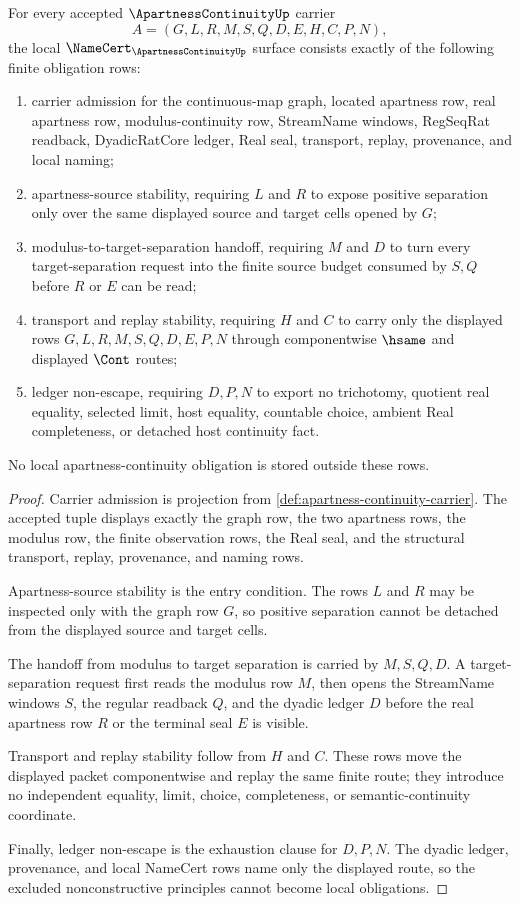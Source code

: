 \begin{theorem}
\label{thm:apartness-continuity-namecert-obligations}
For every accepted $\ApartnessContinuityUp$ carrier
$$
A=(G,L,R,M,S,Q,D,E,H,C,P,N),
$$
the local $\NameCert_{\ApartnessContinuityUp}$ surface consists exactly of the following finite obligation rows:
\begin{enumerate}
\item carrier admission for the continuous-map graph, located apartness row, real apartness row, modulus-continuity row, StreamName windows, RegSeqRat readback, DyadicRatCore ledger, Real seal, transport, replay, provenance, and local naming;
\item apartness-source stability, requiring $L$ and $R$ to expose positive separation only over the same displayed source and target cells opened by $G$;
\item modulus-to-target-separation handoff, requiring $M$ and $D$ to turn every target-separation request into the finite source budget consumed by $S,Q$ before $R$ or $E$ can be read;
\item transport and replay stability, requiring $H$ and $C$ to carry only the displayed rows $G,L,R,M,S,Q,D,E,P,N$ through componentwise $\hsame$ and displayed $\Cont$ routes;
\item ledger non-escape, requiring $D,P,N$ to export no trichotomy, quotient real equality, selected limit, host equality, countable choice, ambient Real completeness, or detached host continuity fact.
\end{enumerate}
No local apartness-continuity obligation is stored outside these rows.
\end{theorem}
\begin{proof}
Carrier admission is projection from \autoref{def:apartness-continuity-carrier}. The accepted tuple displays exactly the graph row, the two apartness rows, the modulus row, the finite observation rows, the Real seal, and the structural transport, replay, provenance, and naming rows.

Apartness-source stability is the entry condition. The rows $L$ and $R$ may be inspected only with the graph row $G$, so positive separation cannot be detached from the displayed source and target cells.

The handoff from modulus to target separation is carried by $M,S,Q,D$. A target-separation request first reads the modulus row $M$, then opens the StreamName windows $S$, the regular readback $Q$, and the dyadic ledger $D$ before the real apartness row $R$ or the terminal seal $E$ is visible.

Transport and replay stability follow from $H$ and $C$. These rows move the displayed packet componentwise and replay the same finite route; they introduce no independent equality, limit, choice, completeness, or semantic-continuity coordinate.

Finally, ledger non-escape is the exhaustion clause for $D,P,N$. The dyadic ledger, provenance, and local NameCert rows name only the displayed route, so the excluded nonconstructive principles cannot become local obligations.
\end{proof}

